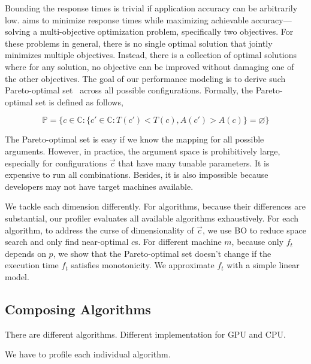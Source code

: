 Bounding the response times is trivial if application accuracy can be
arbitrarily low. \sysname{} aims to minimize response times while maximizing
achievable accuracy---solving a multi-objective optimization problem,
specifically two objectives. For these problems in general, there is no single
optimal solution that jointly minimizes multiple objectives. Instead, there is a
collection of optimal solutions where for any solution, no objective can be
improved without damaging one of the other objectives. The goal of our
performance modeling is to derive such Pareto-optimal
set~\cite{collette2013multiobjective} across all possible
configurations. Formally, the Pareto-optimal set is defined as follows,

{\small \vspace{-1.2em}
  \begin{equation}
    \mathbb{P} = \{ c \in \mathbb{C} : \{ c' \in \mathbb{C}: T(c') < T(c),
    A(c') > A(c) \} = \varnothing\}
  \label{eq:pareto-2}
\end{equation}
\vspace{-1.2em}
}

 The Pareto-optimal set is easy if we know the mapping for all
possible arguments. However, in practice, the argument space is prohibitively
large, especially for configurations $\vec{c}$ that have many tunable
parameters. It is expensive to run all combinations. Besides, it is also
impossible because developers may not have target machines available.

 We tackle each dimension differently. For algorithms,
because their differences are substantial, our profiler evaluates all available
algorithms exhaustively. For each algorithm, to address the curse of
dimensionality of $\vec{c}$, we use BO to reduce space search and only find
near-optimal $c$s. For different machine $m$, because only $f_t$ depends on $p$,
we show that the Pareto-optimal set doesn't change if the execution time $f_t$
satisfies monotonicity. We approximate $f_t$ with a simple linear model.

\subsection{Composing Algorithms}
\label{sec:compose-models}

There are different algorithms. Different implementation for GPU and CPU.

We have to profile each individual algorithm.

